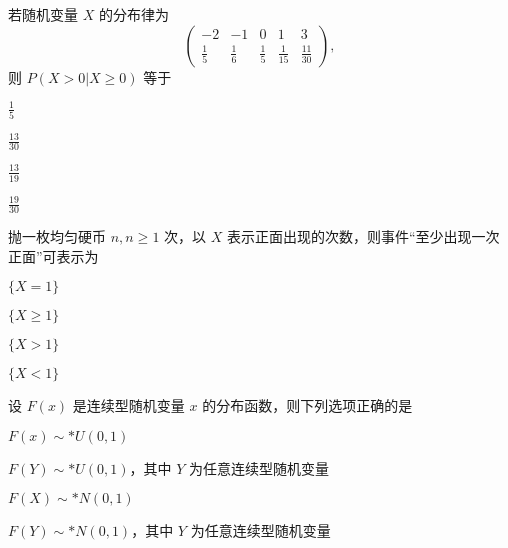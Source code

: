 \documentclass{exam-zh}
\begin{document}
\begin{question}
  若随机变量 $X$ 的分布律为
  $$
  \left(\begin{matrix}
  -2 & -1 & 0 & 1 & 3 \\
  \frac{1}{5} & \frac{1}{6} & \frac{1}{5} & \frac{1}{15} & \frac{11}{30}
  \end{matrix} \right),
  $$ 
  则 $P(X > 0|X \geq 0)$ 等于 \paren[C]
  \begin{choices}
    \item $\frac{1}{5}$  
    \item $\frac{13}{30}$  
    \item $\frac{13}{19}$  
    \item $\frac{19}{30}$  
  \end{choices}
\end{question}

\begin{question}
  抛一枚均匀硬币 $n, n \geq 1$ 次，以 $X$ 表示正面出现的次数，则事件“至少出现一次正面”可表示为 \paren[B]
  \begin{choices}
    \item $\{X=1\}$  
    \item $\{X\geq 1\}$  
    \item $\{X>1\}$  
    \item $\{X<1\}$  
  \end{choices}
\end{question}

\begin{question}
  设 $F(x)$ 是连续型随机变量 $x$ 的分布函数，则下列选项正确的是 \paren[A]
  \begin{choices}
    \item $F(x) \sim* U(0,1)$  
    \item $F(Y) \sim* U(0,1)$，其中 $Y$ 为任意连续型随机变量  
    \item $F(X) \sim* N(0,1)$  
    \item $F(Y) \sim* N(0,1)$，其中 $Y$ 为任意连续型随机变量  
  \end{choices}
\end{question}
\end{document}
